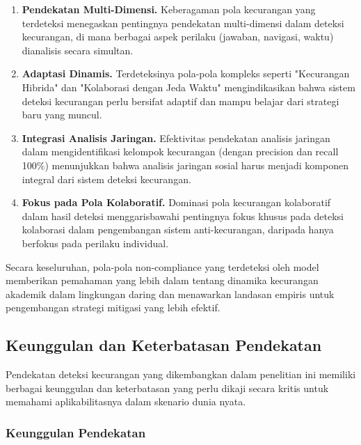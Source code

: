 \begin{enumerate}
    \item \textbf{Pendekatan Multi-Dimensi.} Keberagaman pola kecurangan yang terdeteksi menegaskan pentingnya pendekatan multi-dimensi dalam deteksi kecurangan, di mana berbagai aspek perilaku (jawaban, navigasi, waktu) dianalisis secara simultan.
    
    \item \textbf{Adaptasi Dinamis.} Terdeteksinya pola-pola kompleks seperti "Kecurangan Hibrida" dan "Kolaborasi dengan Jeda Waktu" mengindikasikan bahwa sistem deteksi kecurangan perlu bersifat adaptif dan mampu belajar dari strategi baru yang muncul.
    
    \item \textbf{Integrasi Analisis Jaringan.} Efektivitas pendekatan analisis jaringan dalam mengidentifikasi kelompok kecurangan (dengan precision dan recall 100\%) menunjukkan bahwa analisis jaringan sosial harus menjadi komponen integral dari sistem deteksi kecurangan.
    
    \item \textbf{Fokus pada Pola Kolaboratif.} Dominasi pola kecurangan kolaboratif dalam hasil deteksi menggarisbawahi pentingnya fokus khusus pada deteksi kolaborasi dalam pengembangan sistem anti-kecurangan, daripada hanya berfokus pada perilaku individual.
\end{enumerate}

Secara keseluruhan, pola-pola non-compliance yang terdeteksi oleh model memberikan pemahaman yang lebih dalam tentang dinamika kecurangan akademik dalam lingkungan daring dan menawarkan landasan empiris untuk pengembangan strategi mitigasi yang lebih efektif.

\subsection{Keunggulan dan Keterbatasan Pendekatan}
\label{subsec:keunggulanKeterbatasan}

Pendekatan deteksi kecurangan yang dikembangkan dalam penelitian ini memiliki berbagai keunggulan dan keterbatasan yang perlu dikaji secara kritis untuk memahami aplikabilitasnya dalam skenario dunia nyata.

\subsubsection{Keunggulan Pendekatan}

